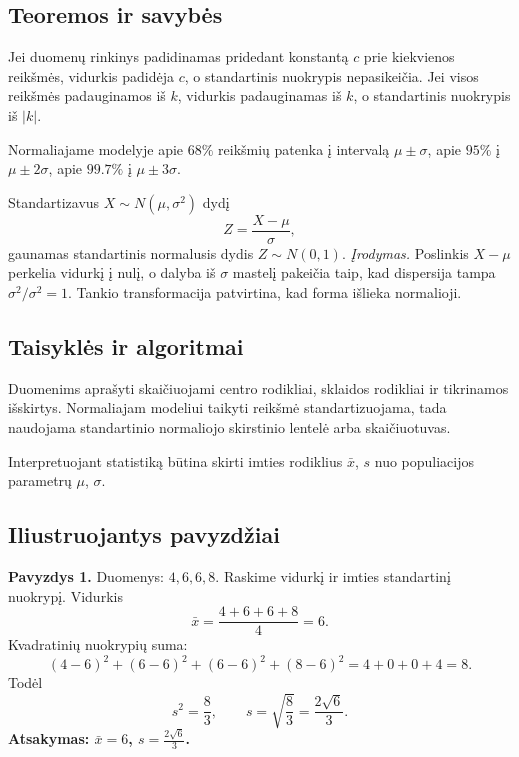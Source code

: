 \subsection{Teoremos ir savybės}

\begin{savybe}
Jei duomenų rinkinys padidinamas pridedant konstantą $c$ prie kiekvienos reikšmės, vidurkis padidėja $c$, o standartinis nuokrypis nepasikeičia. Jei visos reikšmės padauginamos iš $k$, vidurkis padauginamas iš $k$, o standartinis nuokrypis iš $|k|$.
\end{savybe}

\begin{savybe}
Normaliajame modelyje apie $68\%$ reikšmių patenka į intervalą $\mu\pm\sigma$, apie $95\%$ į $\mu\pm2\sigma$, apie $99.7\%$ į $\mu\pm3\sigma$.
\end{savybe}

\begin{teorema}
Standartizavus $X\sim N(\mu,\sigma^2)$ dydį
\[
Z=\frac{X-\mu}{\sigma},
\]
gaunamas standartinis normalusis dydis $Z\sim N(0,1)$.
\emph{Įrodymas.} Poslinkis $X-\mu$ perkelia vidurkį į nulį, o dalyba iš $\sigma$ mastelį pakeičia taip, kad dispersija tampa $\sigma^2/\sigma^2=1$. Tankio transformacija patvirtina, kad forma išlieka normalioji.
\end{teorema}

\subsection{Taisyklės ir algoritmai}

Duomenims aprašyti skaičiuojami centro rodikliai, sklaidos rodikliai ir tikrinamos išskirtys. Normaliajam modeliui taikyti reikšmė standartizuojama, tada naudojama standartinio normaliojo skirstinio lentelė arba skaičiuotuvas.

Interpretuojant statistiką būtina skirti imties rodiklius $\bar x$, $s$ nuo populiacijos parametrų $\mu$, $\sigma$.

\subsection{Iliustruojantys pavyzdžiai}

\textbf{Pavyzdys 1.} Duomenys: $4,6,6,8$. Raskime vidurkį ir imties standartinį nuokrypį. Vidurkis
\[
\bar x=\frac{4+6+6+8}{4}=6.
\]
Kvadratinių nuokrypių suma:
\[
(4-6)^2+(6-6)^2+(6-6)^2+(8-6)^2=4+0+0+4=8.
\]
Todėl
\[
s^2=\frac{8}{3},\qquad s=\sqrt{\frac83}=\frac{2\sqrt6}{3}.
\]
\textbf{Atsakymas: $\bar x=6$, $s=\frac{2\sqrt6}{3}$.}

